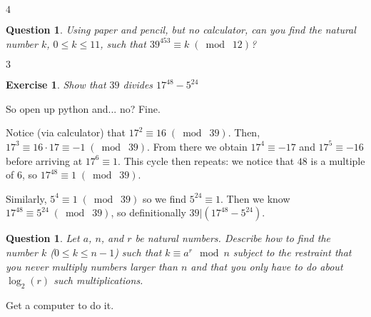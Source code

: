 \documentclass{article}
\newtheorem{ques}[thm]{Question}
\newtheorem{ex}[thm]{Exercise}
\numberwithin{equation}{thm}
\providecommand{\gmod}[1]{\; (\bmod \; #1)}
\begin{document}
$4$



\begin{ques} \label{3.4}
  Using paper and pencil, but no calculator, can you find the natural number $k$, $0 \leq k \leq 11$, such that $39^{453} \equiv k \gmod{12}$?
\end{ques}

$3$



\begin{ex} \label{3.5}
  Show that $39$ divides $17^{48} - 5^{24}$
\end{ex}

So open up python and... no? Fine.

Notice (via calculator) that $17^2 \equiv 16 \gmod{39}$. Then, $17^3 \equiv 16 \cdot 17 \equiv -1 \gmod{39}$. From there we obtain $17^4 \equiv -17$ and $17^5 \equiv -16$ before arriving at $17^6 \equiv 1$. This cycle then repeats: we notice that $48$ is a multiple of $6$, so $17^{48} \equiv 1 \gmod{39}$.

Similarly, $5^4 \equiv 1 \gmod{39}$ so we find $5^{24} \equiv 1$. Then we know $17^{48} \equiv 5^{24} \gmod{39}$, so definitionally $39 | (17^{48} - 5^{24})$.



\begin{ques} \label{3.6}
  Let $a$, $n$, and $r$ be natural numbers. Describe how to find the number $k$ ($0 \leq k \leq n-1$) such that $k \equiv a^{r} \mod n$ subject to the restraint that you never multiply numbers larger than $n$ and that you only have to do about $\log_2 (r)$ such multiplications.
\end{ques}

Get a computer to do it.
\end{document}
